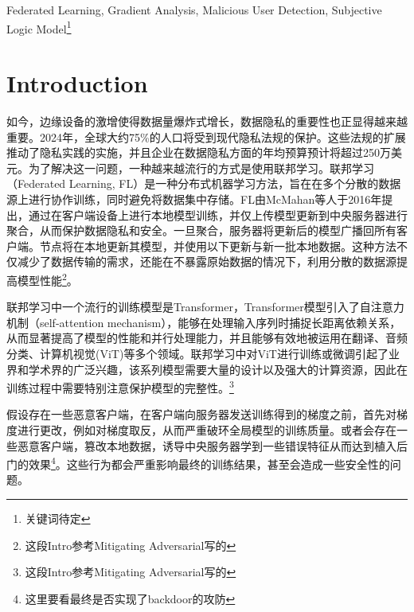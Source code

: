 \documentclass[conference]{IEEEtran}
\begin{document}
\begin{IEEEkeywords}

Federated Learning, Gradient Analysis, Malicious User Detection, Subjective Logic Model\footnote{关键词待定}
\end{IEEEkeywords}

\section{Introduction}

\label{sec:intro}



如今，边缘设备的激增使得数据量爆炸式增长\cite{edgeComputing_explosiveGrowth}，数据隐私的重要性也正显得越来越重要。2024年，全球大约75\%的人口将受到现代隐私法规的保护。这些法规的扩展推动了隐私实践的实施，并且企业在数据隐私方面的年均预算预计将超过250万美元\cite{dataPrivacyIsEncreasing}。为了解决这一问题，一种越来越流行的方式是使用联邦学习\cite{useFL2solve}。联邦学习（Federated Learning, FL）是一种分布式机器学习方法，旨在在多个分散的数据源上进行协作训练，同时避免将数据集中存储。FL由McMahan等人于2016年提出，通过在客户端设备上进行本地模型训练，并仅上传模型更新到中央服务器进行聚合，从而保护数据隐私和安全。一旦聚合，服务器将更新后的模型广播回所有客户端。节点将在本地更新其模型，并使用以下更新与新一批本地数据。这种方法不仅减少了数据传输的需求，还能在不暴露原始数据的情况下，利用分散的数据源提高模型性能\cite{FLGenesisArticle}\footnote{这段Intro参考Mitigating Adversarial写的}。

联邦学习中一个流行的训练模型是Transformer\cite{transformer}，Transformer模型引入了自注意力机制（self-attention mechanism），能够在处理输入序列时捕捉长距离依赖关系，从而显著提高了模型的性能和并行处理能力，并且能够有效地被运用在翻译\cite{transformer_translation}、音频分类\cite{transformer_audioClassification}、计算机视觉(ViT)\cite{transformer_vision}等多个领域。联邦学习中对ViT进行训练或微调引起了业界和学术界的广泛兴趣\cite{transformer_gotInterest}，该系列模型需要大量的设计以及强大的计算资源，因此在训练过程中需要特别注意保护模型的完整性。\footnote{这段Intro参考Mitigating Adversarial写的}

假设存在一些恶意客户端，在客户端向服务器发送训练得到的梯度之前，首先对梯度进行更改，例如对梯度取反，从而严重破环全局模型的训练质量。或者会存在一些恶意客户端，篡改本地数据，诱导中央服务器学到一些错误特征从而达到植入后门的效果\footnote{这里要看最终是否实现了backdoor的攻防}。这些行为都会严重影响最终的训练结果，甚至会造成一些安全性的问题。
\end{document}
